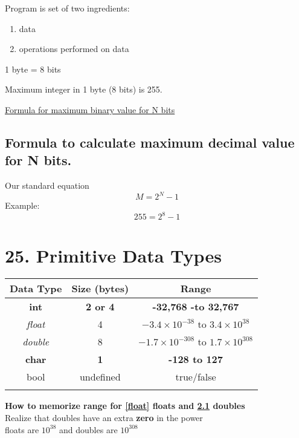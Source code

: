 \documentclass[a4paper,12pt]{book}
\begin{document}
	
Program is set of two ingredients: 
\begin{enumerate}
	\item 	data
	\item operations performed on data
\end{enumerate}	


	1 byte = 8 bits
	
	Maximum integer in 1 byte (8 bits) is 255.
	
	\href{https://www.sciencedirect.com/topics/engineering/binary-word}{Formula for maximum binary value for N bits} \\
	\section{Formula to calculate maximum decimal value for N bits.}
Our standard equation \\
		$$M = 2^{N} - 1$$
	Example:	
		$$255 = 2^{8} - 1$$


\chapter{25. Primitive Data Types}

\begin{table}[]
\begin{tabular}{ccc}
\hline
{Data Type}               & {Size (bytes) }               & {Range}               \\ \hline
\textbf{int}            & \textbf{2 or 4}            & \textbf{-32,768 -to 32,767}      \label{int}   \\ 
\textit{float}                    &4                      &$-3.4 \times 10^{-38}$ to $3.4 \times 10^{38}$     \label{float}             \\
\textit{double}                     &8                      & $-1.7 \times 10^{-308}$ to $1.7 \times 10^{308}$       \label{double}     \\ \hline
\textbf{char}            & \textbf{1}            & \textbf{-128 to 127}            \\
bool                     &undefined                      &true/false                      \\
\multicolumn{1}{l}{} & \multicolumn{1}{l}{} & \multicolumn{1}{l}{} 
\end{tabular}
\end{table}

\textbf{How to memorize range for \ref{float} floats and \ref{double} doubles} \\
Realize that doubles have an extra \textbf{zero} in the power \\
floats are \textbf{$10^{38}$} and doubles are \textbf{$10^{308}$}
\end{document}
